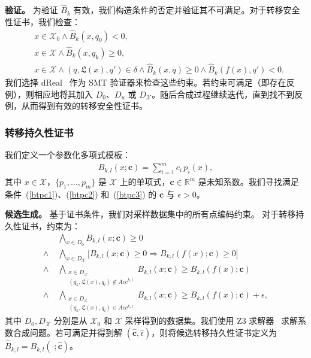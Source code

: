 \textbf{验证。} 为验证 $\hat{B}_k$ 有效，我们构造条件的否定并验证其不可满足。对于转移安全性证书，我们检查：
\begin{align}
  & x \in \mathcal{X}_0 \land \hat{B}_k(x, q_0) < 0, \label{smt:cex-init} \\ 
  & x \in \mathcal{X} \land \hat{B}_k(x, q_k) \geq 0, \label{smt:cex-unsafe}  \\ 
  & x \in \mathcal{X} \land (q, \mathfrak{L}(x), q') \in \delta \land \hat{B}_k(x, q) \geq 0 \land \hat{B}_k(f(x), q') < 0. \label{smt:cex-inv}
\end{align}
我们选择 dReal~\cite{gao2013dreal} 作为 SMT 验证器来检查这些约束。若约束可满足（即存在反例），则相应地将其加入 $D_0$、$D_u$ 或 $D_{\mathcal{X}}$。随后合成过程继续迭代，直到找不到反例，从而得到有效的转移安全性证书。

\subsubsection{转移持久性证书} 
我们定义一个参数化多项式模板：
\begin{align}
B_{k,l}(x; \mathbf{c}) = \sum_{i=1}^{m} c_i \, p_i(x),
\end{align}
其中 $x \in \mathcal{X}$，$\{p_1, \ldots, p_{m}\}$ 是 $\mathcal{X}$ 上的单项式，$\mathbf{c} \in \mathbb{R}^{m}$ 是未知系数。我们寻找满足条件~(\ref{btpc1})、(\ref{btpc2}) 和~(\ref{btpc3}) 的 $\mathbf{c}$ 与 $\epsilon > 0$。

\textbf{候选生成。} 基于证书条件，我们对采样数据集中的所有点编码约束。
对于转移持久性证书，约束为：
\begin{align}
  & \bigwedge_{x \in D_0} B_{k,l}(x; \mathbf{c}) \geq 0 \label{smt:tp-init} \\ 
  \wedge \; &\bigwedge_{x \in D_{\mathcal{X}}} \big[ B_{k,l}(x; \mathbf{c}) \geq 0 \Rightarrow B_{k,l}(f(x); \mathbf{c}) \geq 0 \big] \label{smt:tp-inv} \\ 
  \wedge \; &\bigwedge_{\substack{x \in D_{\mathcal{X}} \\ (q_k, \mathfrak{L}(x), q_l) \notin Acc^{k,l}}} B_{k,l}(x; \mathbf{c}) \geq B_{k,l}(f(x); \mathbf{c}) \label{smt:tp-non-dec} \\ 
  \wedge \; &\bigwedge_{\substack{x \in D_{\mathcal{X}} \\ (q_k, \mathfrak{L}(x), q_l) \in Acc^{k,l}}} B_{k,l}(x; \mathbf{c}) \geq B_{k,l}(f(x); \mathbf{c}) + \epsilon, \label{smt:tp-dec}
\end{align}
其中 $D_0, D_{\mathcal{X}}$ 分别是从 $\mathcal{X}_0$ 和 $\mathcal{X}$ 采样得到的数据集。我们使用 Z3 求解器~\cite{de2008z3} 求解系数合成问题。若可满足并得到解 $(\hat{\mathbf{c}}, \hat{\epsilon})$，则将候选转移持久性证书定义为 $\hat{B}_{k,l} = B_{k,l}(\cdot; \hat{\mathbf{c}})$。


